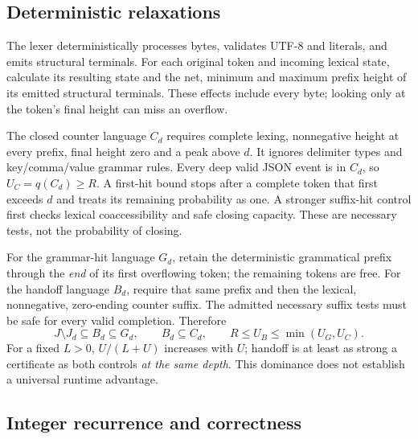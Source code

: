 \documentclass[12pt]{article}
\theoremstyle{readable}
\begin{document}
\subsection{Deterministic relaxations}

The lexer deterministically processes bytes, validates UTF-8 and literals,
and emits structural terminals. For each original token and incoming lexical
state, calculate its resulting state and the net, minimum and maximum prefix
height of its emitted structural terminals. These effects include every byte;
looking only at the token's final height can miss an overflow.

The closed counter language $C_d$ requires complete lexing, nonnegative height
at every prefix, final height zero and a peak above $d$. It ignores delimiter
types and key/comma/value grammar rules. Every deep valid JSON event is in
$C_d$, so $U_C=q(C_d)\ge R$. A first-hit bound stops after a complete token
that first exceeds $d$ and treats its remaining probability as one. A stronger
suffix-hit control first checks lexical coaccessibility and safe closing
capacity. These are necessary tests, not the probability of closing.

For the grammar-hit language $G_d$, retain the deterministic grammatical
prefix through the \emph{end} of its first overflowing token; the remaining
tokens are free. For the handoff language $B_d$, require that same prefix
and then the lexical, nonnegative, zero-ending counter suffix. The admitted
necessary suffix tests must be safe for every valid completion. Therefore
\begin{equation}
 J\setminus J_d\subseteq B_d\subseteq G_d,
 \qquad B_d\subseteq C_d,
 \qquad R\le U_B\le\min(U_G,U_C).
 \label{eq:coverage}
\end{equation}
For a fixed $L>0$, $U/(L+U)$ increases with $U$; handoff is at least as strong
a certificate as both controls \emph{at the same depth}. This dominance does
not establish a universal runtime advantage.

\subsection{Integer recurrence and correctness}
\end{document}
